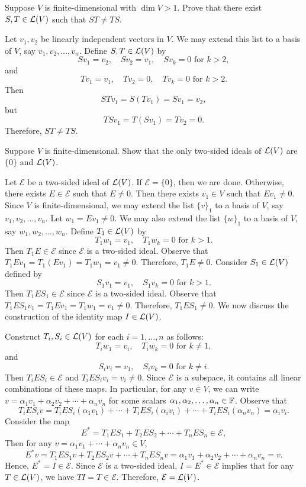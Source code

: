 \begin{exercise}
Suppose $V$ is finite-dimensional with $\dim V>1$. Prove that there exist
$S,T\in\mathcal{L}(V)$ such that $ST\ne TS$.
\end{exercise}
\begin{solution}
Let $v_1,v_2$ be linearly independent vectors in $V$. We may extend this list
to a basis of $V$, say $v_1,v_2,\dots,v_n$. Define $S,T\in\mathcal{L}(V)$ by
\[ Sv_1=v_2, \quad Sv_2=v_1, \quad Sv_k=0 \text{ for } k>2, \]
and
\[ Tv_1=v_1, \quad Tv_2=0, \quad Tv_k=0 \text{ for } k>2. \]
Then
\[ STv_1=S(Tv_1)=Sv_1=v_2, \]
but
\[ TSv_1=T(Sv_1)=Tv_2=0. \]
Therefore, $ST\ne TS$.
\end{solution}

\begin{exercise}
Suppose $V$ is finite-dimensional. Show that the only two-sided ideals of
$\mathcal{L}(V)$ are $\{0\}$ and $\mathcal{L}(V)$.
\end{exercise}
\begin{solution}
Let $\mathcal{E}$ be a two-sided ideal of $\mathcal{L}(V)$. If $\mathcal{E}=\{0\}$,
then we are done. Otherwise, there exists $E\in\mathcal{E}$ such that $E\ne0$.
Then there exists $v_1\in V$ such that $Ev_1\ne0$. Since $V$ is
finite-dimensional, we may extend the list $\{v\}_1$ to a basis of $V$, say
$v_1,v_2,\dots,v_n$. Let $w_1=Ev_1\ne0$. We may also extend the list
$\{w\}_1$ to a basis of $V$, say $w_1,w_2,\dots,w_n$. Define
$T_1\in\mathcal{L}(V)$ by
\[ T_1w_1=v_1, \quad T_1w_k=0 \text{ for } k>1. \]
Then $T_1E\in\mathcal{E}$ since $\mathcal{E}$ is a two-sided ideal. Observe
that $T_1Ev_1=T_1(Ev_1)=T_1w_1=v_1\ne0$. Therefore, $T_1E\ne0$. Consider
$S_1\in\mathcal{L}(V)$ defined by
\[ S_1v_1=v_1, \quad S_1v_k=0 \text{ for } k>1. \]
Then $T_1ES_1\in\mathcal{E}$ since $\mathcal{E}$ is a two-sided ideal.
Observe that $T_1ES_1v_1=T_1Ev_1=T_1w_1=v_1\ne0$. Therefore, $T_1ES_1\ne0$.
We now discuss the construction of the identity map $I\in\mathcal{L}(V)$.

Construct $T_i,S_i\in\mathcal{L}(V)$ for each $i=1,\dots,n$ as follows:
\[ T_iw_1=v_i, \quad T_iw_k=0 \text{ for } k\ne1, \]
and
\[ S_iv_i=v_1, \quad S_iv_k=0 \text{ for } k\ne i. \]
Then $T_iES_i\in\mathcal{E}$ and $T_iES_iv_i=v_i\ne0$. Since $\mathcal{E}$ is
a subspace, it contains all linear combinations of these maps. In particular,
for any $v\in V$, we can write $v=\alpha_1v_1+\alpha_2v_2+\cdots+\alpha_nv_n$
for some scalars $\alpha_1,\alpha_2,\dots,\alpha_n\in\mathbb{F}$. Observe that
\[ T_iES_iv=T_iES_i(\alpha_1v_1)+\cdots+T_iES_i(\alpha_iv_i)+\cdots
   +T_iES_i(\alpha_nv_n)=\alpha_iv_i. \]
Consider the map
\[ E^*=T_1ES_1+T_2ES_2+\cdots+T_nES_n\in\mathcal{E}, \]
Then for any $v=\alpha_1v_1+\cdots+\alpha_nv_n\in V$,
\[ E^*v=T_1ES_1v+T_2ES_2v+\cdots+T_nES_nv
   =\alpha_1v_1+\alpha_2v_2+\cdots+\alpha_nv_n=v. \]
Hence, $E^*=I\in\mathcal{E}$. Since $\mathcal{E}$ is a two-sided ideal,
$I=E^*\in\mathcal{E}$ implies that for any $T\in\mathcal{L}(V)$, we have
$TI=T\in\mathcal{E}$. Therefore, $\mathcal{E}=\mathcal{L}(V)$.
\end{solution}
